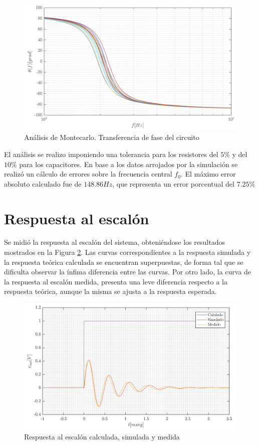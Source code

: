 \begin{figure}[H]
\centering
\includegraphics[scale=0.4]{resources/montecarlo_phase}
\caption{Análisis de Montecarlo. Transferencia de fase del circuito}
\label{1_mc_phase}
\end{figure}

El análisis se realizo imponiendo una tolerancia para los resistores del $5\%$ y del $10\%$ para los capacitores. En base a los datos arrojados por la simulación se realizó un cálculo de errores sobre la frecuencia central $f_0$. El máximo error absoluto calculado fue de $148.86Hz$, que representa un error porcentual del $7.25\%$


\section{Respuesta al escalón}
Se midió la respuesta al escalón del sistema, obteniéndose los resultados mostrados en la Figura \ref{1_step_response}. Las curvas correspondientes a la respuesta simulada y la respuesta teórica calculada se encuentran superpuestas, de forma tal que se dificulta observar la ínfima diferencia entre las curvas. Por otro lado, la curva de la respuesta al escalón medida, presenta una leve diferencia respecto a la respuesta teórica, aunque la misma se ajusta a la respuesta esperada.

\begin{figure}[H]
\centering
\includegraphics[scale=0.4]{resources/step_response}
\caption{Respuesta al escalón calculada, simulada y medida}
\label{1_step_response}
\end{figure}

